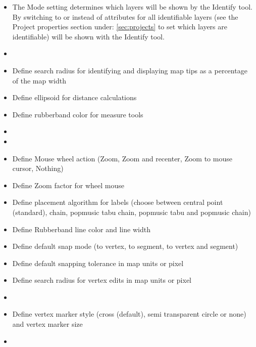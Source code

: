 
\begin{itemize}
\item The Mode setting determines which layers will be shown by the Identify
tool. By switching to  or  instead of  attributes for all identifiable
layers (see the Project properties section under: \ref{sec:projects} to set
which layers are identifiable) will be shown with the Identify tool.
\item {}
\item Define search radius for identifying and displaying map tips as a
percentage of the map width
\item Define ellipsoid for distance calculations
\item Define rubberband color for measure tools
\item {}
\item {}
\item Define Mouse wheel action (Zoom, Zoom and recenter, Zoom to mouse
cursor, Nothing)
\item Define Zoom factor for wheel mouse
\end{itemize}


\begin{itemize}
\item Define placement algorithm for labels (choose between central point
(standard), chain, popmusic tabu chain, popmusic tabu and popmusic chain)
\end{itemize}


\begin{itemize}
\item Define Rubberband line color and line width
\item Define default snap mode (to vertex, to segment, to vertex and segment)
\item Define default snapping tolerance in map units or pixel
\item Define search radius for vertex edits in map units or pixel
\item {}
\item Define vertex marker style (cross (default), semi transparent circle or
none) and vertex marker size
\item {}
\end{itemize}

